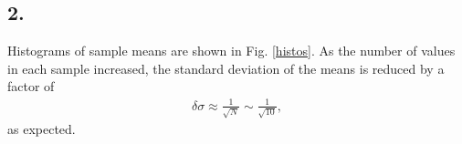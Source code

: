 \documentclass[singlepage,notitlepage,nofootinbib,11pt]{revtex4-1}
\newcommand{\eq}[1]{\begin{align*}#1\end{align*}}
\begin{document}
\subsection{2.}
Histograms of sample means are shown in Fig. \ref{histos}. As the number of values in each sample increased, the standard deviation of the means is reduced by a factor of 
\eq{
\delta\sigma\approx\frac{1}{\sqrt{N}}\sim\frac{1}{\sqrt{10}},
}
as expected.
\begin{figure}[h]
  \centering
  \captionsetup[subfigure]{labelformat=empty}
  \\
  \\

\end{figure}
\end{document}
